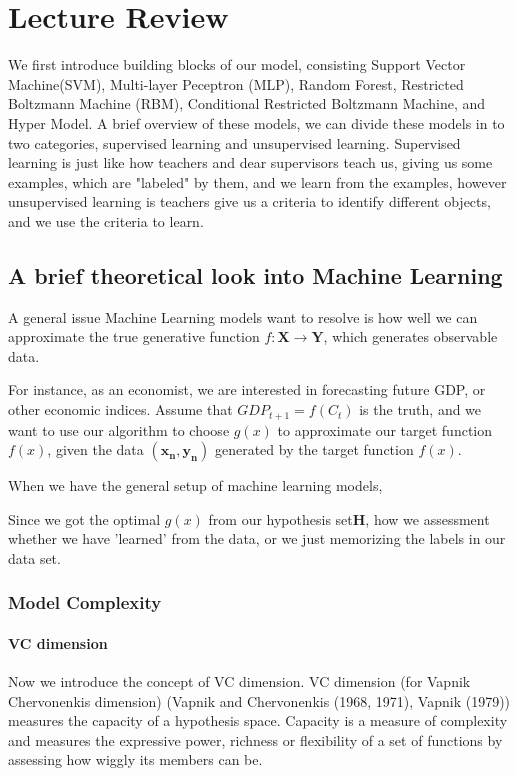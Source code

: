 \chapter{Lecture Review}

    We first introduce building blocks of our model, consisting Support Vector Machine(SVM), Multi-layer Peceptron
(MLP), Random Forest, Restricted Boltzmann Machine (RBM), Conditional Restricted Boltzmann Machine, and Hyper Model. A brief overview of these models, we can divide these models in to two categories, supervised learning and unsupervised learning. Supervised learning is just like how teachers and dear supervisors teach us, giving us some examples, which are "labeled" by them, and we learn from the examples, however unsupervised learning is teachers give us a criteria to identify different objects, and we use the criteria to learn.



\section{A brief theoretical look into Machine Learning}
    A general issue Machine Learning models want to resolve is how well we can approximate the true generative function $f:\mathbf{X}\rightarrow\mathbf{Y} $, which generates observable data.
   
    For instance, as an economist, we are interested in forecasting future GDP, or other economic indices. Assume that $GDP_{t+1} =f(C_{t})$ is the truth, and we want to use our algorithm to choose $g(x)$ to approximate our target function $f(x)$, given the data $(\mathbf{x_{n}},\mathbf{y_{n}}) $ generated by the target function $f(x)$.%

When we have the general setup of machine learning models, %


Since we got the optimal $g(x)$ from our hypothesis set$\mathbf{H}$, how we assessment whether we have 'learned' from the data, or we just memorizing the labels in our data set.%

\clearpage
\subsection*{Model Complexity}
\subsubsection*{VC dimension}
Now we introduce the concept of VC dimension.
VC dimension (for Vapnik Chervonenkis dimension) (Vapnik and Chervonenkis (1968, 1971), Vapnik (1979)) measures the capacity of a hypothesis space. Capacity is a measure of complexity and measures the expressive power, richness or flexibility of a set of functions by assessing how wiggly its members can be.

